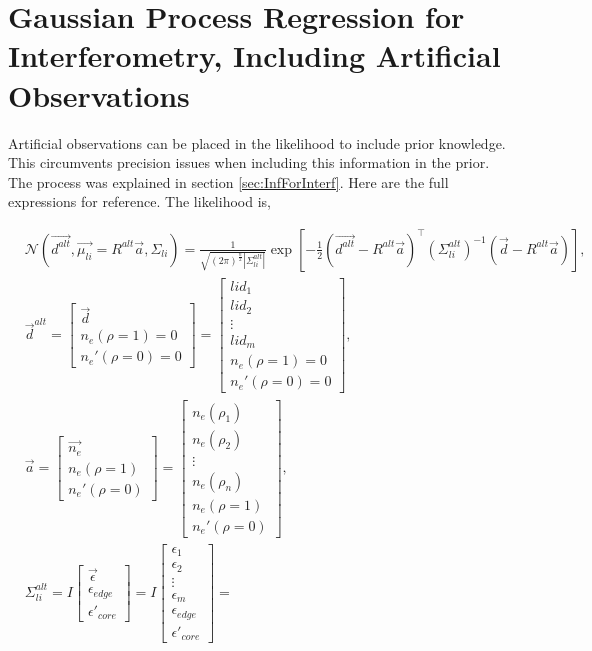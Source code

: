 \section{Gaussian Process Regression for Interferometry, Including Artificial Observations}

Artificial observations can be placed in the likelihood to include prior knowledge. This circumvents precision issues when including this information in the prior. The process was explained in section \ref{sec:InfForInterf}. Here are the full expressions for reference. The likelihood is,

\begin{equation}
\begin{aligned}
&\mathcal{N}(\vec{d^{alt}}, \vec{\mu_{li}} = R^{alt}\vec{a}, \Sigma_{li}) = \frac{1}{\sqrt{(2\pi)^{\frac{n}{2}}|\Sigma_{li}^{alt}|}} \exp \left[{{-\frac{1}{2}(\vec{d^{alt}}-R^{alt}\vec{a})^\top(\Sigma_{li}^{alt})^{-1}(\vec{d}-R^{alt}\vec{a})}}\right],\\
&\vec d^{alt} = \begin{bmatrix} \vec{d}\\ n_e(\rho=1)=0\\ n_e'(\rho=0)=0 \end{bmatrix} = \begin{bmatrix} lid_1\\ lid_2 \\ \vdots \\ lid_m \\ n_e(\rho=1)=0\\ n_e'(\rho=0)=0 \end{bmatrix}, \\
&\vec a = \begin{bmatrix} \vec{n_e}\\ n_e(\rho=1)\\ n_e'(\rho=0) \end{bmatrix} = \begin{bmatrix} n_e(\rho_1)\\ n_e(\rho_2) \\ \vdots \\ n_e(\rho_n) \\ n_e(\rho=1)\\ n_e'(\rho=0) \end{bmatrix}, \\
&\Sigma_{li}^{alt} = I\begin{bmatrix}\vec{\epsilon} \\ \epsilon_{edge} \\ \epsilon'_{core}\end{bmatrix} = I\begin{bmatrix}\epsilon_1 \\ \epsilon_2 \\ \vdots \\ \epsilon_m \\ \epsilon_{edge} \\ \epsilon'_{core}\end{bmatrix} =

\end{aligned}
\end{equation}

